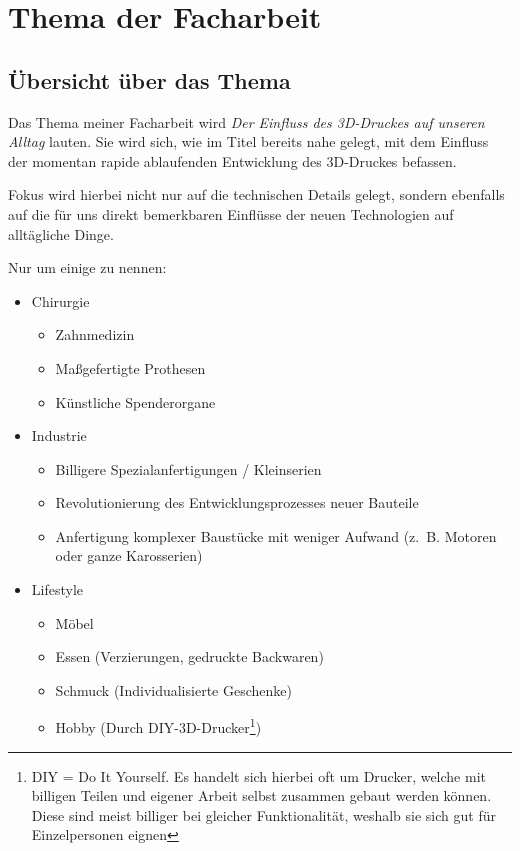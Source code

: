 \documentclass[a4paper, 11pt]{article}
\begin{document}
\section[Thema]{Thema der Facharbeit}
\subsection[Übersicht]{Übersicht über das Thema}
Das Thema meiner Facharbeit wird \emph{Der Einfluss des 3D-Druckes auf unseren Alltag} lauten.
Sie wird sich, wie im Titel bereits nahe gelegt, mit dem Einfluss der momentan rapide ablaufenden Entwicklung des 3D-Druckes befassen.

Fokus wird hierbei nicht nur auf die technischen Details gelegt, sondern ebenfalls auf die für uns direkt bemerkbaren Einflüsse der neuen Technologien auf alltägliche Dinge. 

Nur um einige zu nennen: 
\begin{itemize}
\item Chirurgie
	\begin{itemize}
	\item Zahnmedizin
	\item Maßgefertigte Prothesen
	\item Künstliche Spenderorgane
	\end{itemize}
\item Industrie
	\begin{itemize}
	\item Billigere Spezialanfertigungen / Kleinserien
	\item Revolutionierung des Entwicklungsprozesses neuer Bauteile
	\item Anfertigung komplexer Baustücke mit weniger Aufwand (z.~B. Motoren oder ganze Karosserien)
	\end{itemize}
\item Lifestyle 
	\begin{itemize}
	\item Möbel	
	\item Essen (Verzierungen, gedruckte Backwaren)
	\item Schmuck (Individualisierte Geschenke)
	\item Hobby (Durch DIY-3D-Drucker\footnote{DIY = Do It Yourself. Es handelt sich hierbei oft um Drucker, welche mit billigen Teilen und eigener Arbeit selbst zusammen gebaut werden können. Diese sind meist billiger bei gleicher Funktionalität, weshalb sie sich gut für Einzelpersonen eignen})
	\end{itemize}
\end{itemize}
\end{document}
